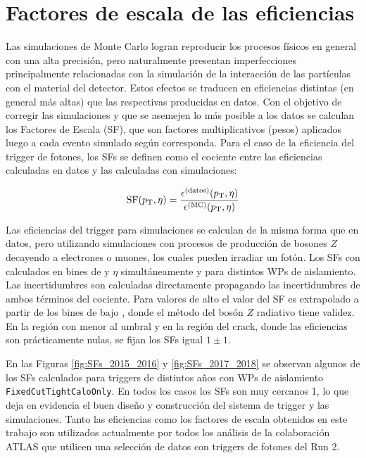\section{Factores de escala de las eficiencias}

Las simulaciones de Monte Carlo logran reproducir los procesos físicos en general con una alta precisión, pero naturalmente presentan imperfecciones principalmente relacionadas con la simulación de la interacción de las partículas con el material del detector. Estos efectos se traducen en eficiencias distintas (en general más altas) que las respectivas producidas en datos. Con el objetivo de corregir las simulaciones y que se asemejen lo más posible a los datos se calculan los Factores de Escala (SF), que son factores multiplicativos (pesos) aplicados luego a cada evento simulado según corresponda. Para el caso de la eficiencia del trigger de fotones, los SFs se definen como el cociente entre las eficiencias calculadas en datos y las calculadas con simulaciones:

\begin{equation}
	\text{SF}(p_{\text{T}}, \eta) = \frac{\epsilon^{\text{(datos)}}(p_{\text{T}}, \eta)}{\epsilon^{\text{(MC)}}(p_{\text{T}}, \eta)}
\end{equation}

Las eficiencias del trigger para simulaciones se calculan de la misma forma que en datos, pero utilizando simulaciones con procesos de producción de bosones $Z$ decayendo a electrones o muones, los cuales pueden irradiar un fotón. Los SFs con calculados en bines de \ET y $\eta$ simultáneamente y para distintos WPs de aislamiento. Las incertidumbres son calculadas directamente propagando las incertidumbres de ambos términos del cociente. Para valores de alto \ET el valor del SF es extrapolado a partir de los bines de bajo \ET, donde el método del bosón $Z$ radiativo tiene validez. En la región con \ET menor al umbral y en la región del crack, donde las eficiencias son prácticamente nulas, se fijan los SFs igual $1\pm1$. 
 
En las Figuras \ref{fig:SFs_2015_2016} y \ref{fig:SFs_2017_2018} se observan algunos de los SFs calculados para triggers de distintos años con WPs de aislamiento \texttt{FixedCutTightCaloOnly}. 
En todos los casos los SFs son muy cercanos 1, lo que deja en evidencia el buen diseño y construcción del sistema de trigger y las simulaciones. Tanto las eficiencias como los factores de escala obtenidos en este trabajo son utilizados actualmente por todos los análisis de la colaboración ATLAS que utilicen una selección de datos con triggers de fotones del Run 2.

